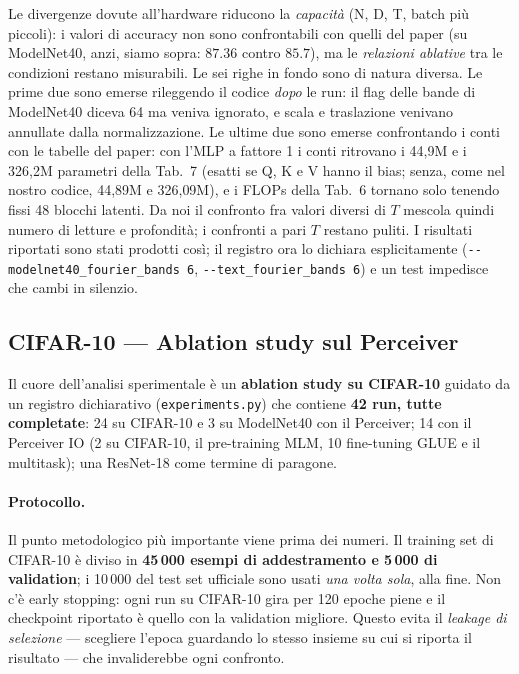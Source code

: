 \documentclass[
  11pt,
]{article}
\begin{document}
\begin{notabox}[title={\textbf{Implicazioni delle divergenze}}]
Le divergenze dovute all'hardware riducono la \emph{capacità} (N, D, T, batch più piccoli): i valori di accuracy non sono confrontabili con quelli del paper (su ModelNet40, anzi, siamo sopra: $87.36$ contro $85.7$), ma le \emph{relazioni ablative} tra le condizioni restano misurabili. Le sei righe in fondo sono di natura diversa. Le prime due sono emerse rileggendo il codice \emph{dopo} le run: il flag delle bande di ModelNet40 diceva 64 ma veniva ignorato, e scala e traslazione venivano annullate dalla normalizzazione. Le ultime due sono emerse confrontando i conti con le tabelle del paper: con l'MLP a fattore 1 i conti ritrovano i 44{,}9M e i 326{,}2M parametri della Tab.~7 (esatti se Q, K e V hanno il bias; senza, come nel nostro codice, 44{,}89M e 326{,}09M), e i FLOPs della Tab.~6 tornano solo tenendo fissi 48 blocchi latenti. Da noi il confronto fra valori diversi di $T$ mescola quindi numero di letture e profondità; i confronti a pari $T$ restano puliti. I risultati riportati sono stati prodotti così; il registro ora lo dichiara esplicitamente (\texttt{-{}-modelnet40\_fourier\_bands 6}, \texttt{-{}-text\_fourier\_bands 6}) e un test impedisce che cambi in silenzio.
\end{notabox}

\subsection{CIFAR-10 --- Ablation study sul Perceiver}
\label{sec:progetto-cifar10}

Il cuore dell'analisi sperimentale è un \textbf{ablation study su CIFAR-10} guidato da un registro dichiarativo (\texttt{experiments.py}) che contiene \textbf{42 run, tutte completate}: 24 su CIFAR-10 e 3 su ModelNet40 con il Perceiver; 14 con il Perceiver IO (2 su CIFAR-10, il pre-training MLM, 10 fine-tuning GLUE e il multitask); una ResNet-18 come termine di paragone.

\paragraph{Protocollo.} Il punto metodologico più importante viene prima dei numeri. Il training set di CIFAR-10 è diviso in \textbf{45\,000 esempi di addestramento e 5\,000 di validation}; i 10\,000 del test set ufficiale sono usati \emph{una volta sola}, alla fine. Non c'è early stopping: ogni run su CIFAR-10 gira per 120 epoche piene e il checkpoint riportato è quello con la validation migliore. Questo evita il \emph{leakage di selezione} --- scegliere l'epoca guardando lo stesso insieme su cui si riporta il risultato --- che invaliderebbe ogni confronto.
\end{document}
